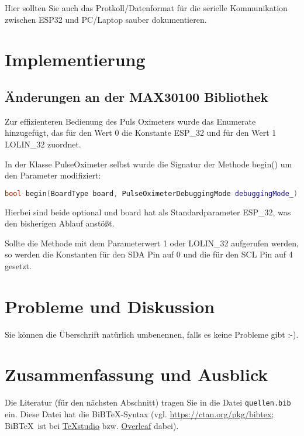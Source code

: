 \documentclass[12pt,oneside]{article}
\newcommand{\quoteM}[1]{\glqq {1}\grqq{} }
\begin{document}
  
  
  
  
  
  
  Hier sollten Sie auch das Protkoll/Datenformat für die serielle Kommunikation zwischen ESP32 und PC/Laptop sauber dokumentieren.
  
  \section{Implementierung}
  
  \subsection{Änderungen an der MAX30100 Bibliothek}
  Zur effizienteren Bedienung des Puls Oximeters wurde das Enumerate \quoteM{BoardType} hinzugefügt, das für den Wert 0 die Konstante ESP\_32 und für den Wert 1 LOLIN\_32 zuordnet.\par
  In der Klasse PulseOximeter selbst wurde die Signatur der Methode begin() um den Parameter \quoteM{board} modifiziert:
	\begin{lstlisting}[language=C++]
bool begin(BoardType board, PulseOximeterDebuggingMode debuggingMode_);
	\end{lstlisting}
	Hierbei sind beide optional und board hat als Standardparameter ESP\_32, was den bisherigen Ablauf anstö\ss t.\par
	Sollte die Methode mit dem Parameterwert 1 oder LOLIN\_32 aufgerufen werden, so werden die Konstanten für den SDA Pin auf 0 und die für den SCL Pin auf 4 gesetzt.

  
  \section{Probleme und Diskussion}
  
  Sie können die Überschrift natürlich umbenennen, falls es keine Probleme gibt :-).
  
  
  \section{Zusammenfassung und Ausblick}
  
  Die Literatur (für den nächsten Abschnitt) tragen Sie in die Datei \texttt{quellen.bib} ein. Diese Datei hat die BiB\TeX-Syntax (vgl. \url{https://ctan.org/pkg/bibtex}; BiB\TeX\ ist bei \href{https://www.heise.de/download/product/texstudio-62955}{\TeX studio} bzw. \href{https://www.overleaf.com}{Overleaf} dabei).
  
\end{document}
